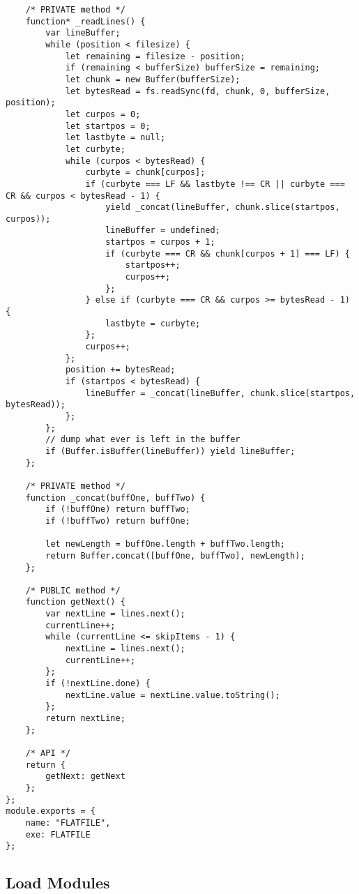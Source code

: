 \begin{verbatim}
    /* PRIVATE method */
    function* _readLines() {
        var lineBuffer;
        while (position < filesize) {
            let remaining = filesize - position;
            if (remaining < bufferSize) bufferSize = remaining;
            let chunk = new Buffer(bufferSize);
            let bytesRead = fs.readSync(fd, chunk, 0, bufferSize, position);
            let curpos = 0;
            let startpos = 0;
            let lastbyte = null;
            let curbyte;
            while (curpos < bytesRead) {
                curbyte = chunk[curpos];
                if (curbyte === LF && lastbyte !== CR || curbyte === CR && curpos < bytesRead - 1) {
                    yield _concat(lineBuffer, chunk.slice(startpos, curpos));
                    lineBuffer = undefined;
                    startpos = curpos + 1;
                    if (curbyte === CR && chunk[curpos + 1] === LF) {
                        startpos++;
                        curpos++;
                    };
                } else if (curbyte === CR && curpos >= bytesRead - 1) {
                    lastbyte = curbyte;
                };
                curpos++;
            };
            position += bytesRead;
            if (startpos < bytesRead) {
                lineBuffer = _concat(lineBuffer, chunk.slice(startpos, bytesRead));
            };
        };
        // dump what ever is left in the buffer
        if (Buffer.isBuffer(lineBuffer)) yield lineBuffer;
    };

    /* PRIVATE method */
    function _concat(buffOne, buffTwo) {
        if (!buffOne) return buffTwo;
        if (!buffTwo) return buffOne;

        let newLength = buffOne.length + buffTwo.length;
        return Buffer.concat([buffOne, buffTwo], newLength);
    };

    /* PUBLIC method */
    function getNext() {
        var nextLine = lines.next();
        currentLine++;
        while (currentLine <= skipItems - 1) {
            nextLine = lines.next();
            currentLine++;
        };
        if (!nextLine.done) {
            nextLine.value = nextLine.value.toString();
        };
        return nextLine;
    };

    /* API */
    return {
        getNext: getNext
    };
};
module.exports = {
    name: "FLATFILE",
    exe: FLATFILE
};
\end{verbatim}


\subsection{Load Modules}
